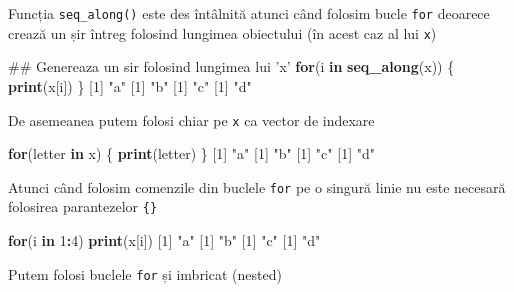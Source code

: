 \documentclass[]{article}
\newenvironment{Shaded}{\begin{snugshade}}{\end{snugshade}}
\newcommand{\KeywordTok}[1]{\textcolor[rgb]{0.13,0.29,0.53}{\textbf{#1}}}
\newcommand{\DecValTok}[1]{\textcolor[rgb]{0.00,0.00,0.81}{#1}}
\newcommand{\StringTok}[1]{\textcolor[rgb]{0.31,0.60,0.02}{#1}}
\newcommand{\ControlFlowTok}[1]{\textcolor[rgb]{0.13,0.29,0.53}{\textbf{#1}}}
\newcommand{\OperatorTok}[1]{\textcolor[rgb]{0.81,0.36,0.00}{\textbf{#1}}}
\newcommand{\NormalTok}[1]{#1}
\begin{document}
Funcția \texttt{seq\_along()} este des întâlnită atunci când folosim
bucle \texttt{for} deoarece crează un șir întreg folosind lungimea
obiectului (în acest caz al lui \texttt{x})

\begin{Shaded}
\begin{Highlighting}[]
\NormalTok{## Genereaza un sir folosind lungimea lui 'x'}
\ControlFlowTok{for}\NormalTok{(i }\ControlFlowTok{in} \KeywordTok{seq_along}\NormalTok{(x)) \{   }
        \KeywordTok{print}\NormalTok{(x[i])}
\NormalTok{\}}
\NormalTok{[}\DecValTok{1}\NormalTok{] }\StringTok{"a"}
\NormalTok{[}\DecValTok{1}\NormalTok{] }\StringTok{"b"}
\NormalTok{[}\DecValTok{1}\NormalTok{] }\StringTok{"c"}
\NormalTok{[}\DecValTok{1}\NormalTok{] }\StringTok{"d"}
\end{Highlighting}
\end{Shaded}

De asemeanea putem folosi chiar pe \texttt{x} ca vector de indexare

\begin{Shaded}
\begin{Highlighting}[]
\ControlFlowTok{for}\NormalTok{(letter }\ControlFlowTok{in}\NormalTok{ x) \{}
        \KeywordTok{print}\NormalTok{(letter)}
\NormalTok{\}}
\NormalTok{[}\DecValTok{1}\NormalTok{] }\StringTok{"a"}
\NormalTok{[}\DecValTok{1}\NormalTok{] }\StringTok{"b"}
\NormalTok{[}\DecValTok{1}\NormalTok{] }\StringTok{"c"}
\NormalTok{[}\DecValTok{1}\NormalTok{] }\StringTok{"d"}
\end{Highlighting}
\end{Shaded}

Atunci când folosim comenzile din buclele \texttt{for} pe o singură
linie nu este necesară folosirea parantezelor \texttt{\{\}}

\begin{Shaded}
\begin{Highlighting}[]
\ControlFlowTok{for}\NormalTok{(i }\ControlFlowTok{in} \DecValTok{1}\OperatorTok{:}\DecValTok{4}\NormalTok{) }\KeywordTok{print}\NormalTok{(x[i])}
\NormalTok{[}\DecValTok{1}\NormalTok{] }\StringTok{"a"}
\NormalTok{[}\DecValTok{1}\NormalTok{] }\StringTok{"b"}
\NormalTok{[}\DecValTok{1}\NormalTok{] }\StringTok{"c"}
\NormalTok{[}\DecValTok{1}\NormalTok{] }\StringTok{"d"}
\end{Highlighting}
\end{Shaded}

Putem folosi buclele \texttt{for} și imbricat (nested)
\end{document}
